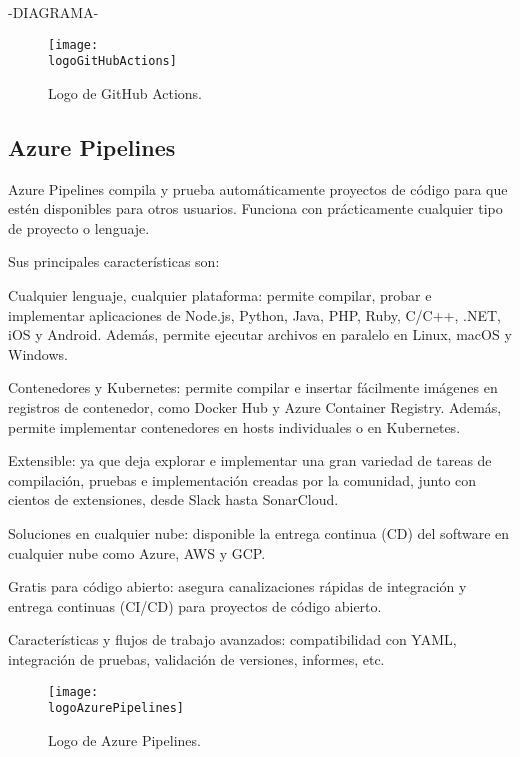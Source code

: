 -DIAGRAMA-

\begin{figure}[h]
    \centering
    \texttt{[image: \\logoGitHubActions]}
    \caption{Logo de GitHub Actions.}
\end{figure}

\subsection{Azure Pipelines}
Azure Pipelines compila y prueba automáticamente proyectos de código para que estén disponibles para otros usuarios. Funciona con prácticamente cualquier tipo de proyecto o lenguaje.

Sus principales características son:
\begin{compactitem}
    \item Cualquier lenguaje, cualquier plataforma: permite compilar, probar e implementar aplicaciones de Node.js, Python, Java, PHP, Ruby, C/C++, .NET, iOS y Android. Además, permite ejecutar archivos en paralelo en Linux, macOS y Windows.
    \item Contenedores y Kubernetes: permite compilar e insertar fácilmente imágenes en registros de contenedor, como Docker Hub y Azure Container Registry. Además, permite implementar contenedores en hosts individuales o en Kubernetes.
    \item Extensible: ya que deja explorar e implementar una gran variedad de tareas de compilación, pruebas e implementación creadas por la comunidad, junto con cientos de extensiones, desde Slack hasta SonarCloud.
    \item Soluciones en cualquier nube: disponible la entrega continua (CD) del software en cualquier nube como Azure, AWS y GCP.
    \item Gratis para código abierto: asegura canalizaciones rápidas de integración y entrega continuas (CI/CD) para proyectos de código abierto.
    \item Características y flujos de trabajo avanzados: compatibilidad con YAML, integración de pruebas, validación de versiones, informes, etc.
\end{compactitem}

\begin{figure}[h]
    \centering
    \texttt{[image: \\logoAzurePipelines]}
    \caption{Logo de Azure Pipelines.}
\end{figure}

